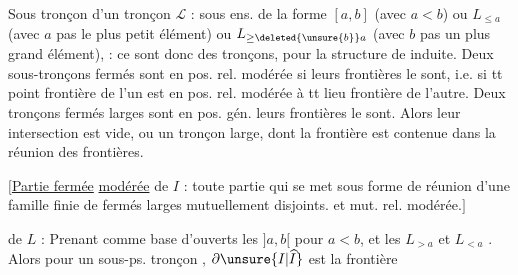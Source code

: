 Sous tronçon  d'un tronçon $\mathcal L$ : sous ens. de la forme $[a,b]$ (avec $a<b$) ou $L_{\leq a}$ (avec $a$ pas le plus petit élément) ou $L_{\geq\deleted{\unsure{b}}a}$ (avec $b$ pas un plus grand élément),  : ce sont donc des tronçons, pour la structure de  induite.
 Deux sous-tronçons fermés sont  en pos. rel. modérée si leurs frontières le sont, i.e. si tt  point frontière de l'un est en pos. rel. modérée à tt lieu frontière de l'autre.
  Deux tronçons fermés larges sont en pos. gén.  leurs frontières  le sont.
Alors leur intersection est vide,  ou un  tronçon large, dont la frontière est contenue dans  la réunion des frontières.

$\bigl[$\uline{Partie fermée} \uline{modérée} de $I$ : toute partie qui se met sous forme de réunion d'une famille finie de  fermés larges mutuellement disjoints. et mut.  rel. modérée.$\bigr]$

 de $L$  : Prenant comme base d'ouverts les  $]a,b[$ pour $a<b$, et les $L_{>a}$ et $L_{<a}$ \unsure{(}. Alors  pour un sous-ps. tronçon , $\partial\unsure{I|\widehat I}$ est la frontière
\margin{\uline{NB} Il n'y a pas besoin d'introduire les $L_{>a}$ \unsure{et} si $L$ \unsure{n'a} pas de plus grand élément, et itou pour $L_{<a}$ si \unsure{$a$|$L$} n'a pas de \unsure{plus} petit élément. \unsure{Dans ce cas|Dans} \illegible{2} $]a,b[$.}

